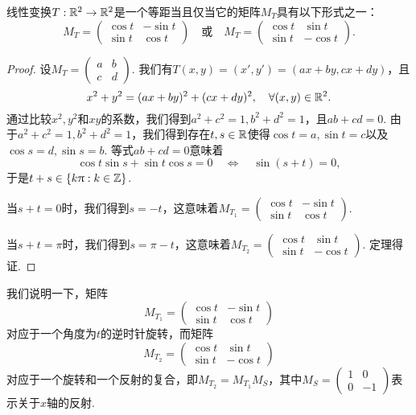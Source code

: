 \begin{mybox}
  \begin{theorem}
    线性变换$T:\mathbb R^2\to\mathbb R^2$是一个等距当且仅当它的矩阵$M_T$具有以下形式之一：
    \[
      M_T = \begin{pmatrix}
        \cos t & -\sin t \\
        \sin t & \cos t
      \end{pmatrix} \quad \text{或} \quad
      M_T = \begin{pmatrix}
        \cos t & \sin t \\
        \sin t & -\cos t
      \end{pmatrix}.
    \]
  \end{theorem}
\end{mybox}
\begin{proof}
  设$M_T=\begin{pmatrix}
    a & b \\
    c & d
  \end{pmatrix}$. 我们有$T(x,y)=(x',y')=(ax+by,cx+dy)$，且
  \[
    x^2 + y^2 = (ax + by)^2 + (cx + dy)^2,\quad \forall (x,y) \in \mathbb R^2.
  \]
  通过比较$x^2,y^2$和$xy$的系数，我们得到$a^2+c^2=1,b^2+d^2=1$，且$ab+cd=0$. 由于$a^2+c^2=1,b^2+d^2=1$，我们得到存在$t,s\in\mathbb R$使得$\cos t=a,\sin t=c$以及$\cos s=d,\sin s=b$. 等式$ab+cd=0$意味着
  \[
    \cos t\sin s + \sin t \cos s = 0 \quad \Leftrightarrow \quad \sin(s + t) = 0,
  \]
  于是$t+s\in\{k\uppi:k\in\mathbb Z\}$.

  当$s+t=0$时，我们得到$s=-t$，这意味着$M_{T_1}=\begin{pmatrix}
    \cos t & -\sin t \\
    \sin t & \cos t
  \end{pmatrix}$.

  当$s+t=\pi$时，我们得到$s=\pi-t$，这意味着$M_{T_2}=\begin{pmatrix}
    \cos t & \sin t \\
    \sin t & -\cos t
  \end{pmatrix}$. 定理得证.
\end{proof}

\begin{remark}
  我们说明一下，矩阵
  \[
    M_ {T_1}=\begin{pmatrix}
      \cos t & -\sin t \\
      \sin t & \cos t
    \end{pmatrix}
  \]
  对应于一个角度为$t$的逆时针旋转，而矩阵
  \[
    M_ {T_2}=\begin{pmatrix}
      \cos t & \sin t \\
      \sin t & -\cos t
    \end{pmatrix}
  \]
  对应于一个旋转和一个反射的复合，即$M_{T_2}=M_{T_1}M_S$，其中$M_S=\begin{pmatrix}
    1 & 0 \\
    0 & -1
  \end{pmatrix}$表示关于$x$轴的反射.
\end{remark}

